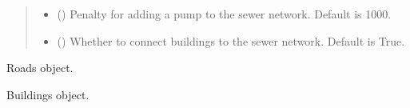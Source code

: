 \documentclass[letterpaper,10pt,english]{sphinxmanual}
\begin{document}
\begin{fulllineitems}
\begin{quote}
\begin{description}
\begin{itemize}
\item {} 
\sphinxAtStartPar
{} (\sphinxstyleliteralemphasis{\sphinxupquote{, }}) \textendash{} Penalty for adding a pump to the sewer network. Default is 1000.

\item {} 
\sphinxAtStartPar
{} (\sphinxstyleliteralemphasis{\sphinxupquote{, }}) \textendash{} Whether to connect buildings to the sewer network. Default is True.

\end{itemize}

\end{description}\end{quote}

\begin{fulllineitems}
\label{\detokenize{pysewer:pysewer.preprocessing.ModelDomain.roads}}
\pysigstartsignatures
{}
\pysigstopsignatures
\sphinxAtStartPar
Roads object.
\begin{quote}\begin{description}
\sphinxAtStartPar
{\hyperref[\detokenize{pysewer:pysewer.preprocessing.Roads}]{}}

\end{description}\end{quote}

\end{fulllineitems}


\begin{fulllineitems}
\label{\detokenize{pysewer:pysewer.preprocessing.ModelDomain.buildings}}
\pysigstartsignatures
{}
\pysigstopsignatures
\sphinxAtStartPar
Buildings object.
\begin{quote}\begin{description}
\sphinxAtStartPar
{\hyperref[\detokenize{pysewer:pysewer.preprocessing.Buildings}]{}}


\end{description}
\end{quote}
\end{fulllineitems}
\end{fulllineitems}
\end{document}
